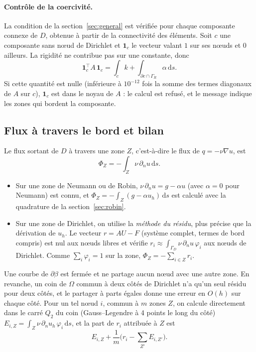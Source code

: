 \documentclass[11pt,a4paper]{article}
\begin{document}
\paragraph{Contrôle de la coercivité.} La condition de la
section~\ref{sec:general} est vérifiée pour chaque composante connexe de $D$,
obtenue à partir de la connectivité des éléments. Soit $c$ une composante sans
nœud de Dirichlet et $\mathbf{1}_c$ le vecteur valant $1$ sur ses nœuds et $0$
ailleurs. La rigidité ne contribue pas sur une constante, donc
\[
\mathbf{1}_c^{\top} A\, \mathbf{1}_c = \int_c k + \int_{\partial c \cap \Gamma_R} \alpha\, \mathrm{d}s .
\]
Si cette quantité est nulle (inférieure à $10^{-12}$ fois la somme des termes
diagonaux de $A$ sur $c$), $\mathbf{1}_c$ est dans le noyau de $A$ : le calcul
est refusé, et le message indique les zones qui bordent la composante.

\subsection{Flux à travers le bord et bilan}
\label{sec:flux}

Le flux sortant de $D$ à travers une zone $Z$, c'est-à-dire le flux de
$q = -\nu \nabla u$, est
\[
\Phi_Z = -\int_Z \nu\, \partial_n u \,\mathrm{d}s .
\]
\begin{itemize}
  \item Sur une zone de Neumann ou de Robin, $\nu\, \partial_n u = g - \alpha u$
        (avec $\alpha = 0$ pour Neumann) est connu, et
        $\Phi_Z = -\int_Z (g - \alpha u_h)\, \mathrm{d}s$ est calculé avec la
        quadrature de la section~\ref{sec:robin}.
  \item Sur une zone de Dirichlet, on utilise la \emph{méthode du résidu},
        plus précise que la dérivation de $u_h$. Le vecteur $r = A U - F$
        (système complet, termes de bord compris) est nul aux nœuds libres
        et vérifie $r_i \approx \int_{\Gamma_D} \nu\, \partial_n u\, \varphi_i$
        aux nœuds de Dirichlet. Comme $\sum_i \varphi_i = 1$ sur la zone,
        $\Phi_Z = -\sum_{i \in Z} r_i$.
\end{itemize}
Une courbe de $\partial\beta$ est fermée et ne partage aucun nœud avec une
autre zone. En revanche, un coin de $\Omega$ commun à deux côtés de Dirichlet
n'a qu'un seul résidu pour deux côtés, et le partager à parts égales donne
une erreur en $O(h)$ sur chaque côté. Pour un tel nœud $i$, commun à $m$ zones
$Z$, on calcule directement dans le carré $Q_2$ du coin (Gauss--Legendre à
4 points le long du côté)
$E_{i,Z} = \int_Z \nu\, \partial_n u_h\, \varphi_i\, \mathrm{d}s$, et la part
de $r_i$ attribuée à $Z$ est
\[
E_{i,Z} + \frac{1}{m}\Big( r_i - \sum_{Z'} E_{i,Z'} \Big).
\]
\end{document}
